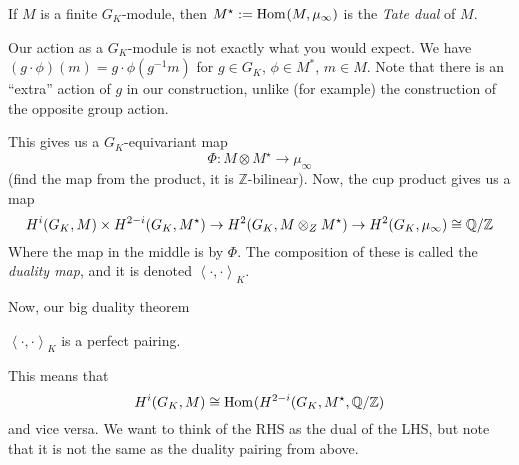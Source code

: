 \begin{defn}
	If \(M\) is a finite \(G_{K}\)-module, then \(M^{\star} :=
	\operatorname{Hom}_{} (M,\mu_{\infty})\) is the \textit{Tate dual} of \(M\).
\end{defn}

Our action as a \(G_{K}\)-module is not exactly what you would expect.
We have  \((g \cdot \phi)(m) = g \cdot \phi(g^{-1} m)\) for \(g \in G_{K}\),
\(\phi \in M^{*}\), \(m \in M\).
Note that there is an ``extra'' action of \(g\) in our construction,
unlike (for example) the construction of the opposite group action.

This gives us a \(G_{K}\)-equivariant map  
\[
\Phi : M \otimes M^{\star} \to \mu_{\infty}
\] 
(find the map from the product, it is \(\mathbb{Z}\)-bilinear).
Now, the cup product gives us a map
\[
	H^{i}(G_{K},M) \times H^{2-i}(G_{K},M^{\star})
	\to H^{2}(G_{K}, M \otimes_{Z} M^{\star})
	\to H^{2}(G_{K}, \mu_{\infty})
	\cong \mathbb{Q} / \mathbb{Z}
\] 
Where the map in the middle is by \(\Phi\).
The composition of these is called the \textit{duality map}, and it is 
denoted \(\left<\cdot,\cdot \right>_{K}\).

Now, our big duality theorem

\begin{thm}
	\(\left<\cdot,\cdot\right>_{K}\) is a perfect pairing.
\end{thm}

This means that 
\[
	H^{i}(G_{K},M) \cong \operatorname{Hom}_{} (H^{2-i}(G_{K},M^{\star},\mathbb{Q} / \mathbb{Z})
\] 
and vice versa.
We want to think of the RHS as the dual of the LHS, but note that it 
is not the same as the duality pairing from above. 





